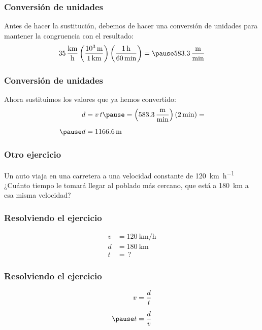 \documentclass[14pt]{beamer}
\begin{document}
\begin{frame}
\frametitle{Conversión de unidades}
Antes de hacer la sustitución, debemos de hacer una conversión de unidades para mantener la congruencia con el resultado:
\pause
\begin{eqnarray*}
\begin{aligned}
\SI[per-mode=fraction]{35}{\kilo\meter\per\hour} \left( \dfrac{\SI{d3}{\meter}}{\SI{1}{\kilo\meter}} \right) \left( \dfrac{\SI{1}{\hour}}{\SI{60}{\minute}} \right) = \pause \SI[per-mode=fraction]{583.3}{\meter\per\minute}
\end{aligned}
\end{eqnarray*}
\end{frame}
\begin{frame}
\frametitle{Conversión de unidades}
Ahora sustituimos los valores que ya hemos convertido:
\pause
\begin{eqnarray*}
\begin{aligned}
d &= v \, t \pause = \left( \SI[per-mode=fraction]{583.3}{\meter\per\minute} \right) \left( \SI{2}{\minute} \right) = \\[0.5em] \pause
d &= \SI{1166.6}{\meter}
\end{aligned}
\end{eqnarray*}
\end{frame}
\begin{frame}
\frametitle{Otro ejercicio}
Un auto viaja en una carretera a una velocidad constante de \SI{120}{\kilo\meter\per\hour}
\\
\bigskip
\pause
¿Cuánto tiempo le tomará llegar al poblado más cercano, que está a \SI{180}{\kilo\meter} a esa misma velocidad?
\end{frame}
\begin{frame}
\frametitle{Resolviendo el ejercicio}
\pause
\begin{align*}
v &= \SI{120}{\kilo\meter\per\hour} \\[0.5em]
d &= \SI{180}{\kilo\meter} \\[0.5em]
t &= \, ?
\end{align*}
\end{frame}
\begin{frame}
\frametitle{Resolviendo el ejercicio}
\pause
\begin{eqnarray*}
\begin{aligned}
v &= \dfrac{d}{t} \\[0.5em] \pause
t &= \dfrac{d}{v}
\end{aligned}
\end{eqnarray*}
\end{frame}
\end{document}
